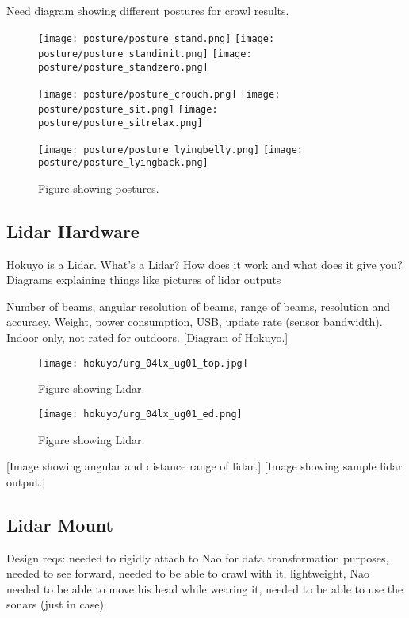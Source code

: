 Need diagram showing different postures for crawl results. 
\begin{figure}
  \centerline{
    \texttt{[image: posture/posture\_stand.png]}
    \texttt{[image: posture/posture\_standinit.png]}
    \texttt{[image: posture/posture\_standzero.png]}
  }
  \vspace*{0.05in}
  \centerline{
    \texttt{[image: posture/posture\_crouch.png]}
    \texttt{[image: posture/posture\_sit.png]}
    \texttt{[image: posture/posture\_sitrelax.png]}
  }
  \vspace*{0.05in}
  \centerline{
    \texttt{[image: posture/posture\_lyingbelly.png]}
    \texttt{[image: posture/posture\_lyingback.png]}
    }
  \caption{Figure showing postures.}
  \label{fig:nao_postures1}
\end{figure}

\subsection{Lidar Hardware}
Hokuyo is a Lidar. What's a Lidar? How does it work and what does it give you? 
{Diagrams explaining things like pictures of lidar outputs}

Number of beams, angular resolution of beams, range of beams, resolution and accuracy.
Weight, power consumption, USB, update rate (sensor bandwidth).
Indoor only, not rated for outdoors.
[Diagram of Hokuyo.]

\begin{figure}
  \centering
  \texttt{[image: hokuyo/urg\_04lx\_ug01\_top.jpg]}
  \caption{Figure showing Lidar.}
  \label{fig:lidar_top1}
\end{figure}

\begin{figure}
  \centering
  \texttt{[image: hokuyo/urg\_04lx\_ug01\_ed.png]}
  \caption{Figure showing Lidar.}
  \label{fig:lidar_diagram1}
\end{figure}

[Image showing angular and distance range of lidar.]
[Image showing sample lidar output.]



\subsection{Lidar Mount}
Design reqs: needed to rigidly attach to Nao for data transformation purposes, needed to see forward,
needed to be able to crawl with it, lightweight, Nao needed to be able to move his head while wearing it,
needed to be able to use the sonars (just in case).

